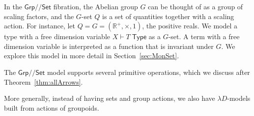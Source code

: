 \documentclass[a4paper,UKenglish]{lipics}
\theoremstyle{plain}
\newcommand{\msf}[1]{\mathsf{#1}} %
\newcommand{\Grp}{\msf{Grp}}
\newcommand{\Set}{\msf{Set}}
\newcommand{\Lslice}[1]{#1/\!/\Set}
\newcommand{\GrpSet}{\Lslice{\Grp}}
\newcommand{\Tj}[2]{#1 \vdash #2 \; \msf{ Type}}
\newcommand{\Dvar}{X}
\begin{document}
\begin{example}
In the $\GrpSet$ fibration, the Abelian group $G$ can be thought of as a group of scaling factors, and the $G$-set $Q$ is a set of quantities together with a scaling action. For instance, let $Q=G=(\mathbb R^+,\times,1)$, the positive reals. We model a type with a free dimension variable $\Tj\Dvar T$ as a $G$-set. A term with a free dimension variable is interpreted as a function that is invariant under $G$. We explore this model in more detail in Section~\ref{sec:MonSet}.

The $\GrpSet$ model supports several primitive operations, which we discuss after Theorem~\ref{thm:allArrows}. \end{example}

More generally, instead of having sets and group actions, we also have $\lambda D$-models built from actions of groupoids.
\end{document}
